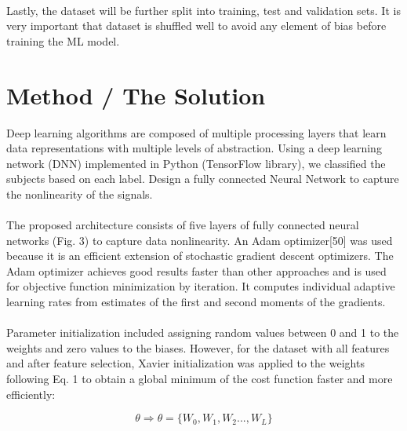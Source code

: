 \documentclass{llncs}       %
\begin{document}
\paragraph{}
Lastly, the dataset will be further split into training, test and validation sets. It is very important that dataset is shuffled well to avoid any element of bias before training the ML model.

\paragraph{}

\section{Method / The Solution}
\label{sec:3}
Deep learning algorithms are composed of multiple processing layers that learn data representations with multiple levels of abstraction. Using a deep learning network (DNN) implemented in Python (TensorFlow library), we classified the subjects based on each label.  Design a fully connected Neural Network to capture the nonlinearity of the signals.
 
\paragraph{}
The proposed architecture consists of five layers of fully connected neural networks (Fig. 3) to capture data nonlinearity. An Adam optimizer[50] was used because it is an efficient extension of stochastic gradient descent optimizers. The Adam optimizer achieves good results faster than other approaches and is used for objective function minimization by iteration. It computes individual adaptive learning rates from estimates of the first and second moments of the gradients.

\paragraph{}
Parameter initialization included assigning random values between 0 and 1 to the weights and zero values to the biases. However, for the dataset with all features and after feature selection, Xavier initialization was applied to the weights following Eq. 1 to obtain a global minimum of the cost function faster and more efficiently: 

\begin{equation} 
\theta\Rightarrow\theta=\{W_{0},W_{1},W_{2}...,W_{L}\}
\end{equation}
\end{document}
